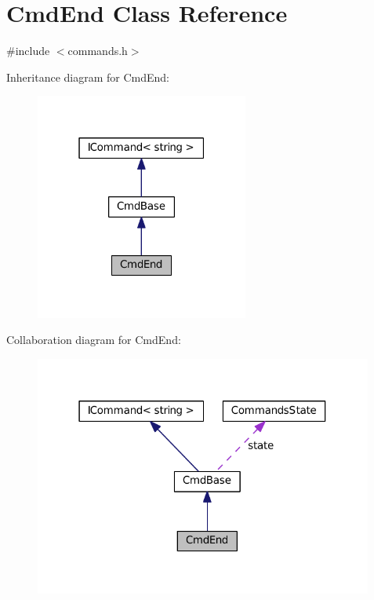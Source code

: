 \hypertarget{class_cmd_end}{}\section{Cmd\+End Class Reference}
\label{class_cmd_end}


{\ttfamily \#include $<$commands.\+h$>$}



Inheritance diagram for Cmd\+End\+:
\nopagebreak
\begin{figure}[H]
\begin{center}
\leavevmode
\includegraphics[width=199pt]{class_cmd_end__inherit__graph}
\end{center}
\end{figure}


Collaboration diagram for Cmd\+End\+:
\nopagebreak
\begin{figure}[H]
\begin{center}
\leavevmode
\includegraphics[width=316pt]{class_cmd_end__coll__graph}
\end{center}
\end{figure}
